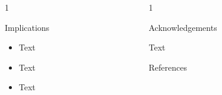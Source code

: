 \documentclass[final]{beamer}
\newlength{\onecolwid}
\newlength{\twocolwid}
\begin{document}
\begin{frame}[t]
\begin{columns}[t]
\begin{column}{\twocolwid}
\begin{columns}[t,totalwidth=\twocolwid]
\begin{column}{1\onecolwid}
\begin{alertblock}{Implications}

\begin{large}
\begin{itemize}
  \item{Text}
  \item{Text}
  \item{Text}
\end{itemize}
\end{large}



\end{alertblock}


\end{column}





\begin{column}{1\onecolwid}






\begin{block}{\large{Acknowledgements}}

\begin{footnotesize}

Text

\end{footnotesize}

\end{block}



\begin{block}{\large{References}}




\end{block}
\end{column}
\end{columns}
\end{column}
\end{columns}
\end{frame}
\end{document}
